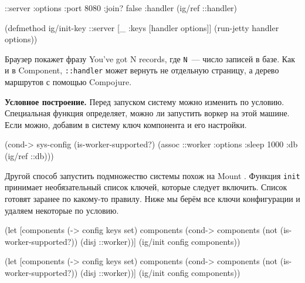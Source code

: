 \else

\begin{english}
  \begin{clojure}
{::server {:options {:port 8080 :join? false}
           :handler (ig/ref ::handler)}}

(defmethod ig/init-key ::server
  [_ {:keys [handler options]}]
  (run-jetty handler options))
  \end{clojure}
\end{english}

\fi

Браузер покажет фразу You've got N records, где \verb|N|~--- число записей
в базе. Как и в Component, \verb|::handler| может вернуть не отдельную
страницу, а дерево маршрутов с помощью Compojure.


\textbf{Условное построение.} Перед запуском систему можно изменить по
условию. Специальная функция определяет, можно ли запустить воркер на этой
машине. Если можно, добавим в систему ключ компонента и его настройки.

\begin{english}
  \begin{clojure}
(cond-> sys-config
  (is-worker-supported?)
  (assoc ::worker {:options {:sleep 1000}
                   :db (ig/ref ::db)}))
  \end{clojure}
\end{english}

Другой способ запустить подмножество системы похож на
Mount . Функция \verb|init| принимает необязательный
список ключей, которые следует включить. Список готовят заранее по какому-то
правилу. Ниже мы берём все ключи конфигурации и удаляем некоторые по условию.

\ifx\DEVICETYPE\MOBILE

\begin{english}
  \begin{clojure}
(let [components (-> config keys set)
      components
      (cond-> components
        (not (is-worker-supported?))
        (disj ::worker))]
  (ig/init config components))
  \end{clojure}
\end{english}

\else

\begin{english}
  \begin{clojure}
(let [components (-> config keys set)
      components (cond-> components
                   (not (is-worker-supported?))
                   (disj ::worker))]
  (ig/init config components))
  \end{clojure}
\end{english}

